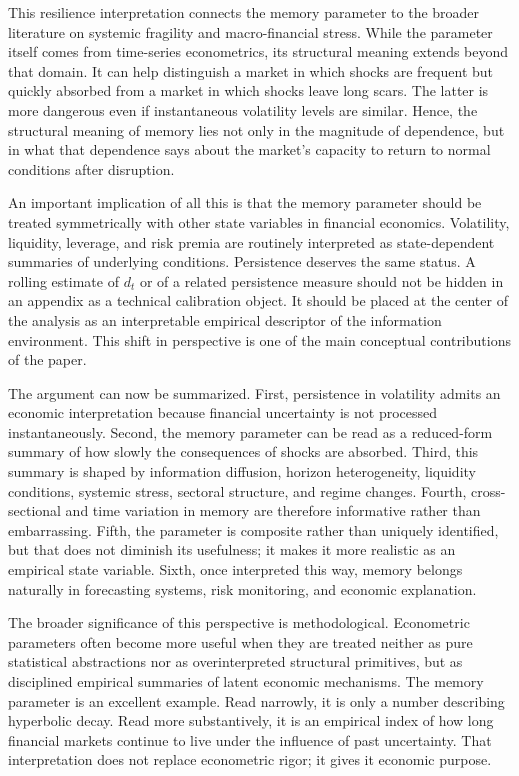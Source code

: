 \documentclass[12pt]{article}
\begin{document}
This resilience interpretation connects the memory parameter to the broader literature on systemic fragility and macro-financial stress. While the parameter itself comes from time-series econometrics, its structural meaning extends beyond that domain. It can help distinguish a market in which shocks are frequent but quickly absorbed from a market in which shocks leave long scars. The latter is more dangerous even if instantaneous volatility levels are similar. Hence, the structural meaning of memory lies not only in the magnitude of dependence, but in what that dependence says about the market's capacity to return to normal conditions after disruption.

An important implication of all this is that the memory parameter should be treated symmetrically with other state variables in financial economics. Volatility, liquidity, leverage, and risk premia are routinely interpreted as state-dependent summaries of underlying conditions. Persistence deserves the same status. A rolling estimate of $d_t$ or of a related persistence measure should not be hidden in an appendix as a technical calibration object. It should be placed at the center of the analysis as an interpretable empirical descriptor of the information environment. This shift in perspective is one of the main conceptual contributions of the paper.

The argument can now be summarized. First, persistence in volatility admits an economic interpretation because financial uncertainty is not processed instantaneously. Second, the memory parameter can be read as a reduced-form summary of how slowly the consequences of shocks are absorbed. Third, this summary is shaped by information diffusion, horizon heterogeneity, liquidity conditions, systemic stress, sectoral structure, and regime changes. Fourth, cross-sectional and time variation in memory are therefore informative rather than embarrassing. Fifth, the parameter is composite rather than uniquely identified, but that does not diminish its usefulness; it makes it more realistic as an empirical state variable. Sixth, once interpreted this way, memory belongs naturally in forecasting systems, risk monitoring, and economic explanation.

The broader significance of this perspective is methodological. Econometric parameters often become more useful when they are treated neither as pure statistical abstractions nor as overinterpreted structural primitives, but as disciplined empirical summaries of latent economic mechanisms. The memory parameter is an excellent example. Read narrowly, it is only a number describing hyperbolic decay. Read more substantively, it is an empirical index of how long financial markets continue to live under the influence of past uncertainty. That interpretation does not replace econometric rigor; it gives it economic purpose.
\end{document}
